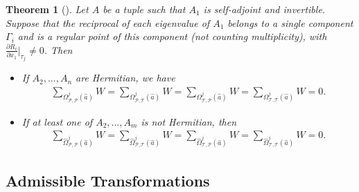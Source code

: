 \documentclass[draft, 12pt, reqno]{amsart}
\numberwithin{equation}{section}
\theoremstyle{plain}
\newtheorem{theorem}{Theorem}[section]
\begin{document}
\begin{theorem}[\cite{S2}]\label{local spectral}
Let $A$ be a tuple such that $A_1$ is self-adjoint and invertible. Suppose that the reciprocal of each eigenvalue of $A_1$  belongs to a single component $\Gamma_i$ and is a regular point of this component (not counting multiplicity), with  $\frac{\partial R_i}{\partial x_1}\Big|_{\tau_j} \neq 0$.
Then
 \begin{itemize} 
\item[(a)] If $A_2,...,A_n$ are Hermitian, we have
\begin{eqnarray}
\displaystyle \sum_{\Omega_{{\mathcal P},{\mathcal P}}^j(\hat{a})} W =\sum_{\Omega_{{\mathcal P},{\mathcal T}}^j(\hat{a})} W =\displaystyle \sum_{\Omega_{{\mathcal T},{\mathcal P}}^j(\hat{a})} W=\sum_{\Omega_{{\mathcal T},{\mathcal T}}^j(\hat{a})} W =0.	\label{local self}
\end{eqnarray}
\item[(b)] If at least one of $A_2,...,A_m$ is not Hermitian, then
\begin{eqnarray}
\displaystyle \sum_{\widehat{\Omega}_{{\mathcal P},{\mathcal P}}^j(\hat{a})} W =\sum_{\widehat{\Omega}_{{\mathcal P},{\mathcal T}}^j(\hat{a})} W =\displaystyle \sum_{\widehat{\Omega}_{{\mathcal T},{\mathcal P}}^j(\hat{a})} W=\sum_{\widehat{\Omega}_{{\mathcal T},{\mathcal T}}^j(\hat{a})} W =0.	\label{local not self}
\end{eqnarray}
\end{itemize}	
	
\end{theorem}

\subsection{Admissible Transformations}
\end{document}
